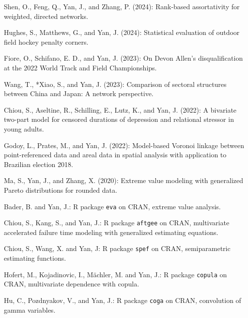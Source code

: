 \documentclass[Statistics]{vita}
\begin{document}
\begin{vita}
\begin{Publications}
\begin{UnderReview}
  \item Shen, O., Feng, Q., Yan, J., and Zhang, P. (2024): Rank-based assortativity for weighted, directed networks.
  \item *Hughes, S., Matthews, G., and Yan, J. (2024): Statistical evaluation of outdoor field hockey penalty corners.
  \item *Fiore, O., Schifano, E. D., and Yan, J. (2023): On Devon Allen’s disqualification at the 2022 World Track and Field Championships.
  \item *Wang, T., *Xiao, S., and Yan, J. (2023): Comparison of sectoral structures between China and Japan: A network perspective.
  \item Chiou, S., Aseltine, R., Schilling, E., Lutz, K., and Yan, J. (2022): A bivariate two-part model for censored durations of depression and relational stressor in young adults.
  \item *Godoy, L., Prates, M., and Yan, J. (2022): Model-based Voronoi linkage between point-referenced data and areal data in spatial analysis with application to Brazilian election 2018.
  \item *Ma, S., Yan, J., and Zhang, X. (2020): Extreme value modeling with generalized Pareto distributions for rounded data.
  \end{UnderReview}
  \begin{Software}
  \item *Bader, B. and Yan, J.: R package \texttt{eva} on CRAN, extreme value analysis.
  \item *Chiou, S., Kang, S., and Yan, J.: R package \texttt{aftgee} on CRAN, multivariate accelerated failure time modeling with generalized estimating equations.
  \item *Chiou, S., Wang, X. and Yan, J: R package \texttt{spef} on CRAN, semiparametric estimating functions.
  \item Hofert, M., Kojadinovic, I.,  M\"achler, M. and Yan, J.: R package \texttt{copula} on CRAN, multivariate dependence with copula.
  \item *Hu, C., Pozdnyakov, V., and Yan, J.: R package \texttt{coga} on CRAN, convolution of gamma variables.

\end{Software}
\end{Publications}
\end{vita}
\end{document}
